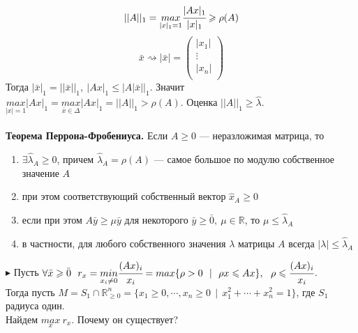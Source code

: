 \documentclass[12pt]{article}
\theoremstyle{definition}
\numberwithin{equation}{section}
\begin{document}
	$$||A||_1=\underset{|x|_1=1}{max}\cfrac{|Ax|_1}{|x|_1} \geqslant \rho(A)$$
	\[\bar x \rightsquigarrow |\bar x|= \begin{pmatrix}
	|x_1|\\
	\vdots\\
	|x_n|\\
	\end{pmatrix}\]
	Тогда $|\bar x|_1=||\bar x||_1,~|Ax|_1\leqslant |A|\bar x||_1.$ Значит $\underset{|x|=1}{max}|Ax|_1=\underset{\bar x \in \Delta}{max}|Ax|_1=||A||_1>\rho(A)$. Оценка $||A||_1 \geqslant \hat \lambda$.
	\\
	\\
	\textbf{Теорема Перрона-Фробениуса.} Если $A\geqslant 0$ --- неразложимая матрица, то 
	\begin{enumerate}
		\item $\exists \hat \lambda_A \geqslant 0$, причем $\hat \lambda_A=\rho(A)$ --- самое большое по модулю собственное значение $A$
		\item при этом соответствующий собственный вектор $\hat x_A \geqslant 0$
		\item если при этом $A\bar y \geqslant \mu \bar y$ для некоторого $\bar y \geqslant \bar 0,~\mu \in \mathbb{R}$, то $\mu \leqslant \hat \lambda_A$
		\item в частности, для любого собственного значения $\lambda$ матрицы $A$ всегда $|\lambda|\leqslant \hat \lambda_A$
	\end{enumerate}
	$\blacktriangleright$ Пусть $\forall \bar x \geqslant \bar 0~~r_x=\underset{x_i \neq 0}{min} \cfrac{(Ax)_i}{x_i}=max \{ \rho >0 ~~|~~\rho x \leqslant Ax \},~~\rho \leqslant \cfrac{(Ax)_i}{x_i}$.\\
	Тогда пусть $M=S_1 \cap \mathbb{R}^n_{\geqslant 0} = \{ x_1 \geqslant 0, \cdots, x_n \geqslant 0~~|~~x_1^2+\cdots +x_n^2=1\}$, где $S_1$ радиуса один.\\
	Найдем $\underset{x}{max}~r_x$. Почему он существует?
\end{document}
